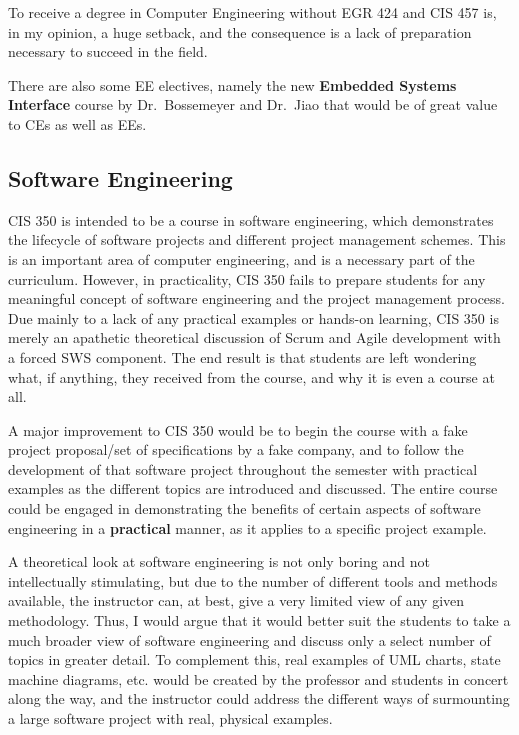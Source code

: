 \documentclass[12pt]{article}
\numberwithin{figure}{section}
\numberwithin{equation}{section}
\begin{document}
{To receive a degree in Computer Engineering without EGR 424 and CIS 457
is, in my opinion, a huge setback, and the consequence is a lack of
preparation necessary to succeed in the field.

\bigskip

There are also some EE electives, namely the new \textbf{Embedded
Systems Interface} course by Dr.~Bossemeyer and Dr.~Jiao that would be
of great value to CEs as well as EEs.

\subsection{Software Engineering}\label{software-engineering}
CIS 350 is intended to be a course in software engineering, which
demonstrates the lifecycle of software projects and different project
management schemes. This is an important area of computer engineering,
and is a necessary part of the curriculum. However, in practicality, CIS
350 fails to prepare students for any meaningful concept of software
engineering and the project management process. Due mainly to a lack of
any practical examples or hands-on learning, CIS 350 is merely an
apathetic theoretical discussion of Scrum and Agile development with a
forced SWS component. The end result is that students are left wondering
what, if anything, they received from the course, and why it is even a
course at all.

\bigskip

A major improvement to CIS 350 would be to begin the course with a fake
project proposal/set of specifications by a fake company, and to follow
the development of that software project throughout the semester with
practical examples as the different topics are introduced and discussed.
The entire course could be engaged in demonstrating the benefits of
certain aspects of software engineering in a \textbf{practical} manner,
as it applies to a specific project example.

\bigskip

A theoretical look at software engineering is not only boring and not
intellectually stimulating, but due to the number of different tools and
methods available, the instructor can, at best, give a very limited view
of any given methodology. Thus, I would argue that it would better suit
the students to take a much broader view of software engineering and
discuss only a select number of topics in greater detail. To complement
this, real examples of UML charts, state machine diagrams, etc. would be
created by the professor and students in concert along the way, and the
instructor could address the different ways of surmounting a large
software project with real, physical examples.

}
\end{document}
